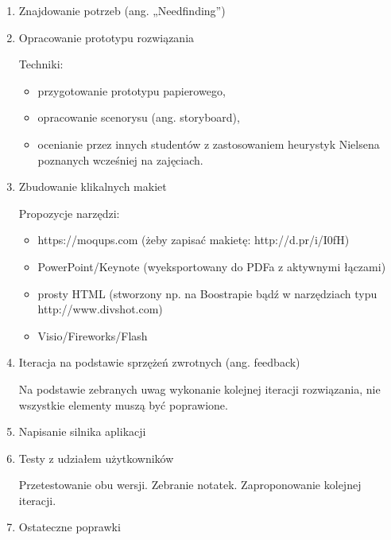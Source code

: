\begin{enumerate}
  \item Znajdowanie potrzeb (ang. „Needfinding”)


  \item Opracowanie prototypu rozwiązania

  Techniki:\begin{itemize}
  \item przygotowanie prototypu papierowego,
  \item opracowanie scenorysu (ang. storyboard),
  \item ocenianie przez innych studentów z zastosowaniem heurystyk Nielsena poznanych wcześniej 
  na zajęciach.
  \end{itemize}

  \item Zbudowanie klikalnych makiet

  Propozycje narzędzi:\begin{itemize}
  \item https://moqups.com (żeby zapisać makietę: http://d.pr/i/I0fH)
  \item PowerPoint/Keynote (wyeksportowany do PDFa z aktywnymi łączami)
  \item prosty HTML (stworzony np. na Boostrapie bądź w narzędziach typu http://www.divshot.com)
  \item Visio/Fireworks/Flash
  \end{itemize}

  \item Iteracja na podstawie sprzężeń zwrotnych (ang. feedback)

  Na podstawie zebranych uwag wykonanie kolejnej iteracji rozwiązania, nie wszystkie elementy muszą być poprawione.


  \item Napisanie silnika aplikacji



  \item Testy z udziałem użytkowników

  Przetestowanie obu wersji. Zebranie notatek. Zaproponowanie kolejnej iteracji.


  \item Ostateczne poprawki

\end{enumerate}
